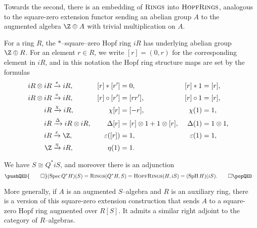Towards the second, there is an embedding of \(\normalfont\textsc{Rings}\) into \(\normalfont\textsc{HopfRings}\), analogous to the square-zero extension functor sending an abelian group \(A\) to the augmented algebra \(\Z \oplus A\) with trivial multiplication on \(A\).

\begin{definition}
For a ring \(R\), the \(\ast\)--square--zero Hopf ring \(iR\) has underlying abelian group \(\Z \oplus R\).  For an element \(r \in R\), we write \([r] = (0, r)\) for the corresponding element in \(iR\), and in this notation the Hopf ring structure maps are set by the formulas
\begin{align*}
iR \otimes iR & \xrightarrow{\ast} iR, & [r] \ast [r'] & = 0, & [r] \ast 1 & = [r], \\
iR \otimes iR & \xrightarrow{\circ} iR, & [r] \circ [r'] & = [rr'], & [r] \circ 1 & = [r], \\
iR & \xrightarrow{\chi} iR, & \chi[r] & = [-r], & \chi(1) & = 1, \\
iR & \xrightarrow{\Delta} iR \otimes iR, & \Delta [r] & = [r] \otimes 1 + 1 \otimes [r], & \Delta(1) & = 1 \otimes 1, \\
iR & \xrightarrow{\eps} \Z, & \eps([r]) & = 1, & \eps(1) & = 1, \\
\Z & \xrightarrow{\eta} iR, & \eta(1) & = 1.
\end{align*}
\end{definition}

\begin{lemma}\label{HopfRingsAndRingsAdjunction}
We have \(S \cong Q^* i S\), and moreover there is an adjunction
\[\pushQED{\qed}
(\Spec Q^* H)(S) = \CatOf{Rings}(Q^* H, S) = \CatOf{HopfRings}(H, iS) = (\SpH H)(iS). \qedhere
\popQED\]
\end{lemma}

\begin{remark}
More generally, if \(A\) is an augmented \(S\)--algebra and \(R\) is an auxiliary ring, there is a version of this square-zero extension construction that sends \(A\) to a square-zero Hopf ring augmented over \(R[S]\).  It admits a similar right adjoint to the category of \(R\)--algebras.
\end{remark}

